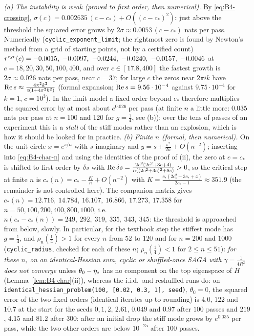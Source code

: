 \begin{remark}\label{rem:B4-visible}
\emph{(a) The instability is weak (proved to first order, then numerical).} By \eqref{eq:B4-crossing}, $\sigma(c)=0.002635\,(c-c_\ast)+O((c-c_\ast)^2)$: just above the threshold the squared error grows by $2\sigma\approx0.0053\,(c-c_\ast)$ nats per pass. Numerically (\texttt{cyclic\_exponent\_limit}; the rightmost zero is found by Newton's method from a grid of starting points, not by a certified count) $r^{\rm cyc}(c)=-0.0015,\ -0.0097,\ -0.0244,\ -0.0240,\ -0.0157,\ -0.0046$ at $c=18,20,30,50,100,400$, and over $c\in[17.8,400]$ the fastest growth is $2\sigma\approx0.026$ nats per pass, near $c=37$; for large $c$ the zeros near $2\pi ik$ have $\operatorname{Re} s\approx\frac{4\pi^2k^2}{c(1+4\pi^2k^2)}$ (formal expansion; $\operatorname{Re} s=9.56\cdot10^{-4}$ against $9.75\cdot10^{-4}$ for $k=1$, $c=10^3$). In the limit model a fixed order beyond $c_\ast$ therefore multiplies the squared error by at most about $e^{0.026}$ per pass (at finite $n$ a little more: $0.035$ nats per pass at $n=100$ and $120$ for $g=\frac14$, see (b)): over the tens of passes of an experiment this is a \emph{stall} of the stiff modes rather than an explosion, which is how it should be looked for in practice.
\emph{(b) Finite $n$ (formal, then numerical).} On the unit circle $x=e^{s/n}$ with $s$ imaginary and $y=s+\frac{s^2}{2n}+O(n^{-2})$; inserting into \eqref{eq:B4-char-n} and using the identities of the proof of (ii), the zero at $c=c_\ast$ is shifted to first order by $\delta s$ with $\operatorname{Re}\delta s=\frac{2c^2(2c^2+3c+4)}{n((2c^2+3c)^2+8c)}>0$, so the critical step at finite $n$ is
$c_\ast(n)=c_\ast-\frac Kn+O(n^{-2})$ with $K=\frac{c_\ast(2c_\ast^2+3c_\ast+4)}{2c_\ast-1}\approx351.9$ (the remainder is not controlled here). The companion matrix gives $c_\ast(n)=12.716,\ 14.784,\ 16.107,\ 16.866,\ 17.273,\ 17.358$ for $n=50,100,200,400,800,1000$, i.e.\ $n(c_\ast-c_\ast(n))=249,\ 292,\ 319,\ 335,\ 343,\ 345$: the threshold is approached from below, slowly. In particular, for the textbook step the stiffest mode has $g=\frac14$, and $\rho_n(\frac14)>1$ for every $n$ from $52$ to $120$ and for $n=200$ and $1000$ (\texttt{cyclic\_radius}, checked for each of these $n$; $\rho_n(\frac14)<1$ for $2\le n\le51$): \emph{for these $n$, on an identical-Hessian sum, cyclic or shuffled-once SAGA with $\gamma=\frac1{4R^2}$ does not converge} unless $\theta_0-\eta_\ast$ has no component on the top eigenspace of $H$ (Lemma~\ref{lem:B4-char}(ii)), whereas the i.i.d.\ and reshuffled runs do: on \texttt{identical\_hessian\_problem(100, [0.02, 0.3, 1], seed)}, $\theta_0=0$, the squared error of the two fixed orders (identical iterates up to rounding) is $4.0$, $122$ and $10.7$ at the start for the seeds $0,1,2$, $2.61$, $0.049$ and $0.97$ after $100$ passes and $219$, $4.15$ and $81.2$ after $300$: after an initial drop the stiff mode grows by $e^{0.035}$ per pass, while the two other orders are below $10^{-25}$ after $100$ passes.

\end{remark}
